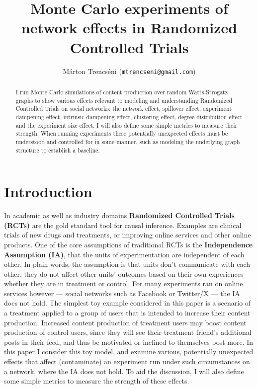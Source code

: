 \documentclass[final,5p,times,twocolumn,authoryear]{elsarticle}
\begin{document}
\begin{frontmatter}

\title{Monte Carlo experiments of network effects in Randomized Controlled Trials}

\author{Márton Trencséni (\texttt{mtrencseni@gmail.com})}

\begin{abstract}
I run Monte Carlo simulations of content production over random Watts-Strogatz graphs to show various effects relevant to modeling and understanding Randomized Controlled Trials on social networks: the network effect, spillover effect, experiment dampening effect, intrinsic dampening effect, clustering effect, degree distribution effect and the experiment size effect. I will also define some simple metrics to measure their strength. When running experiments these potentially unexpected effects must be understood and controlled for in some manner, such as modeling the underlying graph structure to establish a baseline.
 
\end{abstract}

\end{frontmatter}

\section{Introduction}

In academic as well as industry domains \textbf{Randomized Controlled Trials (RCTs)} are the gold standard tool for causal inference. Examples are clinical trials of new drugs and treatments, or improving online services and other online products. One of the core assumptions of traditional RCTs is the \textbf{Independence Assumption (IA)}, that the units of experimentation are independent of each other. In plain words, the assumption is that units don't communicate with each other, they do not affect other units' outcomes based on their own experiences --- whether they are in treatment or control. For many experiments ran on online services however --- social networks such as Facebook or Twitter/X --- the IA does not hold. The simplest toy example considered in this paper is a scenario of a treatment applied to a group of users that is intended to increase their content production. Increased content production of treatment users may boost content production of control users, since they will see their treatment friend's additional posts in their feed, and thus be motivated or inclined to themselves post more. In this paper I consider this toy model, and examine various, potentially unexpected effects that affect (contaminate) an experiment run under such circumstances on a network, where the IA does not hold. To aid the discussion, I will also define some simple metrics to measure the strength of these effects.
\end{document}
